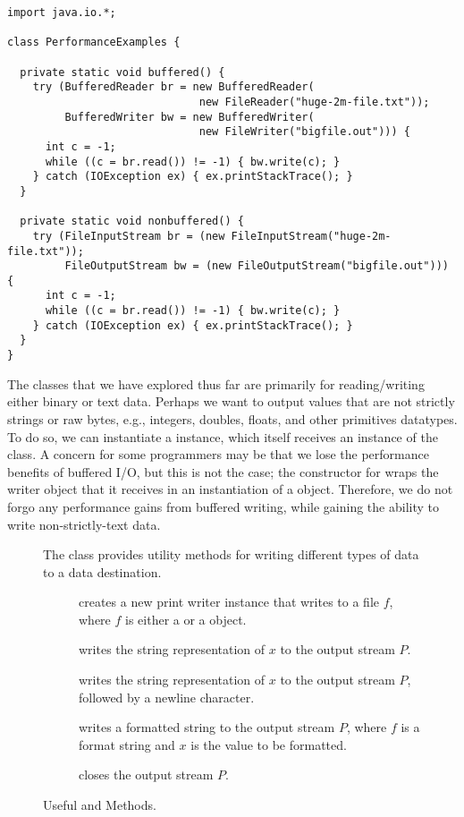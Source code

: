 \begin{lstlisting}[language=MyJava]
import java.io.*;

class PerformanceExamples {
  
  private static void buffered() {
    try (BufferedReader br = new BufferedReader(
                              new FileReader("huge-2m-file.txt"));
         BufferedWriter bw = new BufferedWriter(
                              new FileWriter("bigfile.out"))) {
      int c = -1;
      while ((c = br.read()) != -1) { bw.write(c); }
    } catch (IOException ex) { ex.printStackTrace(); }
  }
  
  private static void nonbuffered() {
    try (FileInputStream br = (new FileInputStream("huge-2m-file.txt"));
         FileOutputStream bw = (new FileOutputStream("bigfile.out"))) {
      int c = -1;
      while ((c = br.read()) != -1) { bw.write(c); }
    } catch (IOException ex) { ex.printStackTrace(); }
  }
}
\end{lstlisting}  

The classes that we have explored thus far are primarily for reading/writing either binary or text data. 
Perhaps we want to output values that are not strictly strings or raw bytes, e.g., integers, doubles, floats, and other primitives datatypes. 
To do so, we can instantiate a  instance, which itself receives an instance of the  class. 
A concern for some programmers may be that we lose the performance benefits of buffered I/O, but this is not the case; the constructor for  wraps the writer object that it receives in an instantiation of a  object. 
Therefore, we do not forgo any performance gains from buffered writing, while gaining the ability to write non-strictly-text data.

\begin{figure}[tp]
  \small
  \begin{tcolorbox}[title=PrintWriter Methods]
    The  class provides utility methods for writing different types of data to a data destination.
    \vspace{2ex}
  \begin{description}
    \item [] creates a new print writer instance that writes to a file $f$, where $f$ is either a  or a  object.
    \item [] writes the string representation of $x$ to the output stream $P$.
    \item [] writes the string representation of $x$ to the output stream $P$, followed by a newline character.
    \item [] writes a formatted string to the output stream $P$, where $f$ is a format string and $x$ is the value to be formatted.
    \item [] closes the output stream $P$.
  \end{description}
\end{tcolorbox}
  \caption{Useful  and  Methods.}
  \label{fig:bwbr}
\end{figure}

